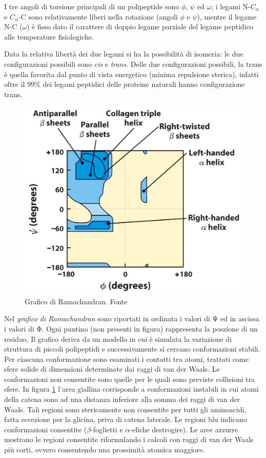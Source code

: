 {{{I tre angoli di torsione principali di un polipeptide sono $\phi$, $\psi$ ed $\omega$; i legami N-$C_{\alpha}$ e $C_{\alpha}$-C sono relativamente liberi nella rotazione (angoli $\phi$ e $\psi$), mentre il legame N-C ($\omega$) è fisso dato il carattere di doppio legame parziale del legame peptidico alle temperature fisiologiche.

\par Data la relativa libertà dei due legami si ha la possibilità di isomeria: le due configurazioni possibili sono \textit{cis } e \textit{trans}. Delle due configurazioni possibili, la trans è quella favorita dal punto di vista
energetico (minima repulsione sterica), infatti oltre il 99\% dei legami peptidici delle proteine naturali hanno configurazione trans.

\begin{figure}[!htb]
	\centering
	\includegraphics[scale=0.4]{images/Ramachandran's_Diagram.jpg}
	\caption{Grafico di Ramachandran. Fonte \cite{ramachandranDiag}}
	\label{fig:ramachandran}
\end{figure}

Nel \textit{grafico di Ramachandran} sono riportati in ordinata i valori di Ψ ed in ascissa i valori di Φ. Ogni puntino (non presenti in figura) rappresenta la poszione di un residuo. Il grafico deriva da un modello in cui è simulata la variazione di struttura di piccoli polipeptidi e successivamente si cercano conformazioni stabili. Per ciascuna conformazione sono esaminati i contatti tra atomi, trattati come sfere solide di dimensioni determinate dai raggi di van der Waals. Le conformazioni non consentite sono quelle per le quali sono previste collisioni tra sfere. In figura \ref{fig:ramachandran} l'area giallina corrisponde a conformazioni instabili in cui atomi della catena sono ad una distanza inferiore alla somma dei raggi di van der Waals. Tali regioni sono stericamente non consentite per tutti gli aminoacidi, fatta eccezione per la glicina, priva di catena laterale. Le regioni blu indicano conformazioni consentite ($\beta$-foglietti e $\alpha$-eliche destrogire). Le aree azzurre mostrano le regioni consentite riformulando i calcoli con raggi di van der Waals più corti, ovvero consentendo una prossimità atomica maggiore.

}}}
